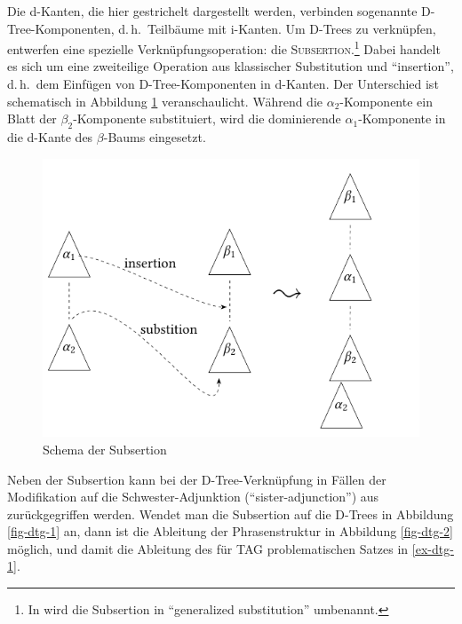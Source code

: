 \largerpage
Die d-Kanten, die hier gestrichelt dargestellt werden, verbinden sogenannte D-Tree-Kompo\-nenten, d.\,h.\ Teilbäume mit i-Kanten. Um D-Trees zu verknüpfen, entwerfen \cite{Rambow:etal:95} eine spezielle Verknüpfungsoperation: die \textsc{Subsertion}.\footnote{In \cite{Rambow:etal:01} wird die Subsertion in "`generalized substitution"' umbenannt.} Dabei handelt es sich um eine zweiteilige Operation aus klassischer Substitution und "`insertion"', d.\,h.\ dem Einfügen von D-Tree-Komponenten in d-Kanten. Der Unterschied ist schematisch in Abbildung \ref{fig-dtg-3} veranschaulicht. Während die $\alpha_2$-Komponente ein Blatt der $\beta_2$-Komponente substituiert, wird die dominierende $\alpha_1$-Komponente in die d-Kante des $\beta$-Baums eingesetzt. 
\begin{figure}[p]
\centering
\includegraphics{graphics/abb69.pdf}
\caption{\label{fig-dtg-3}Schema der Subsertion}
\end{figure}
Neben der Subsertion kann bei der D-Tree-Verknüpfung in Fällen der Modifikation auf die Schwester-Adjunktion ("`sister-adjunction"') aus \cite{Schabes:Shieber:94} zurückgegriffen werden. Wendet man die Subsertion auf die D-Trees in Abbildung \ref{fig-dtg-1} an, dann ist die Ableitung der Phrasenstruktur in Abbildung \ref{fig-dtg-2} möglich, und damit die Ableitung des für TAG problematischen Satzes in \ref{ex-dtg-1}.

